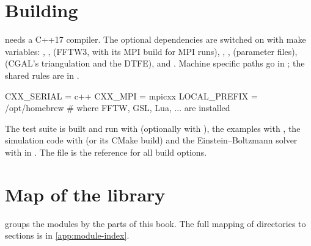 \section{Building}

\fml{} needs a C++17 compiler. The optional dependencies are switched on with make variables: ,
,  (FFTW3, with its MPI build for MPI runs), , ,
 (parameter files),  (CGAL's triangulation and the DTFE),  and . Machine
specific paths go in ; the shared rules are in .
\begin{paramfile}
CXX_SERIAL   = c++
CXX_MPI      = mpicxx
LOCAL_PREFIX = /opt/homebrew      # where FFTW, GSL, Lua, ... are installed
\end{paramfile}
The test suite is built and run with  (optionally with ),
the examples with , the simulation code with  (or its CMake
build) and the Einstein--Boltzmann solver with  in . The file
 is the reference for all build options.

\section{Map of the library}

 groups the modules by the parts of this book. The full mapping of directories to sections is in
\cref{app:module-index}.

